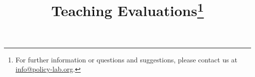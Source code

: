 \title{Teaching Evaluations\thanks{For further information or questions and suggestions, please contact us at \href{mailto: info@policy-lab.org}{info@policy-lab.org}.}}
\author{ }
\date{ } 

